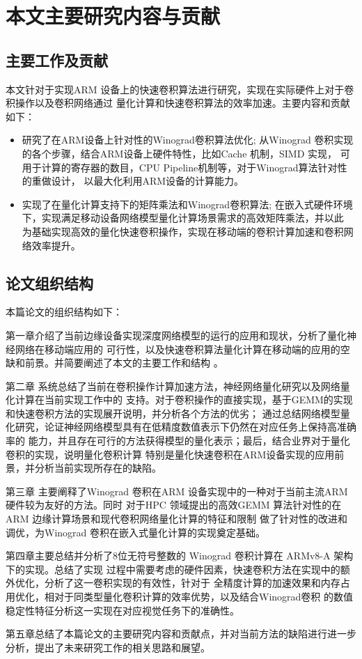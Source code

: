 \section{本文主要研究内容与贡献}

\subsection{主要工作及贡献}

本文针对于实现ARM 设备上的快速卷积算法进行研究，实现在实际硬件上对于卷积操作以及卷积网络通过
量化计算和快速卷积算法的效率加速。主要内容和贡献如下：

\begin{itemize}
    \item 研究了在ARM设备上针对性的Winograd卷积算法优化;
          从Winograd 卷积实现的各个步骤，结合ARM设备上硬件特性，比如Cache 机制，SIMD 实现，
          可用于计算的寄存器的数目，CPU Pipeline机制等，对于Winograd算法针对性的重做设计，
          以最大化利用ARM设备的计算能力。
    \item 实现了在量化计算支持下的矩阵乘法和Winograd卷积算法;
          在嵌入式硬件环境下，实现满足移动设备网络模型量化计算场景需求的高效矩阵乘法，并以此
          为基础实现高效的量化快速卷积操作，实现在移动端的卷积计算加速和卷积网络效率提升。
\end{itemize}

\subsection{论文组织结构}

本篇论文的组织结构如下：

第一章介绍了当前边缘设备实现深度网络模型的运行的应用和现状，分析了量化神经网络在移动端应用的
可行性，以及快速卷积算法量化计算在移动端的应用的空缺和前景。并简要阐述了本文的主要工作和结构 。

第二章 系统总结了当前在卷积操作计算加速方法，神经网络量化研究以及网络量化计算在当前实现工作中的
支持。对于卷积操作的直接实现，基于GEMM的实现和快速卷积方法的实现展开说明，并分析各个方法的优劣；
通过总结网络模型量化研究，论证神经网络模型具有在低精度数值表示下仍然在对应任务上保持高准确率的
能力，并且存在可行的方法获得模型的量化表示；最后，结合业界对于量化卷积的实现，说明量化卷积计算
特别是量化快速卷积在ARM设备实现的应用前景，并分析当前实现所存在的缺陷。

第三章 主要阐释了Winograd 卷积在ARM 设备实现中的一种对于当前主流ARM硬件较为友好的方法。同时
对于HPC 领域提出的高效GEMM 算法针对性的在ARM 边缘计算场景和现代卷积网络量化计算的特征和限制
做了针对性的改进和调优，为Winograd 卷积在嵌入式量化计算的实现奠定基础。

第四章主要总结并分析了8位无符号整数的 Winograd 卷积计算在 ARMv8-A 架构下的实现。总结了实现
过程中需要考虑的硬件因素，快速卷积方法在实现中的额外优化，分析了这一卷积实现的有效性，针对于
全精度计算的加速效果和内存占用优化，相对于同类型量化卷积计算的效率优势，以及结合Winograd卷积
的数值稳定性特征分析这一实现在对应视觉任务下的准确性。

第五章总结了本篇论文的主要研究内容和贡献点，并对当前方法的缺陷进行进一步分析，提出了未来研究工作的相关思路和展望。
